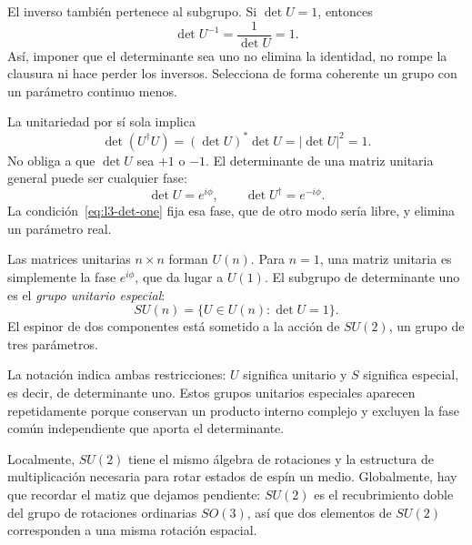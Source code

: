 El inverso también pertenece al subgrupo. Si \(\det U=1\), entonces
\begin{equation}
\det U^{-1}=\frac{1}{\det U}=1.
\end{equation}
Así, imponer que el determinante sea uno no elimina la identidad, no rompe la clausura ni hace perder los inversos. Selecciona de forma coherente un grupo con un parámetro continuo menos.

La unitariedad por sí sola implica
\begin{equation}
\det(U^\dagger U)=
(\det U)^*\det U
=|\det U|^2=1.
\end{equation}
No obliga a que \(\det U\) sea \(+1\) o \(-1\). El determinante de una matriz unitaria general puede ser cualquier fase:
\begin{equation}
\det U=e^{i\phi},
\qquad
\det U^\dagger=e^{-i\phi}.
\end{equation}
La condición~\eqref{eq:l3-det-one} fija esa fase, que de otro modo sería libre, y elimina un parámetro real.

\begin{classroomqa}\end{classroomqa}

Las matrices unitarias \(n\times n\) forman \(U(n)\). Para \(n=1\), una matriz unitaria es simplemente la fase \(e^{i\phi}\), que da lugar a \(U(1)\). El subgrupo de determinante uno es el \emph{grupo unitario especial}:
\begin{equation}
SU(n)=\{U\in U(n):\det U=1\}.
\end{equation}
El espinor de dos componentes está sometido a la acción de \(SU(2)\), un grupo de tres parámetros.

La notación indica ambas restricciones: \(U\) significa unitario y \(S\) significa especial, es decir, de determinante uno. Estos grupos unitarios especiales aparecen repetidamente porque conservan un producto interno complejo y excluyen la fase común independiente que aporta el determinante.

Localmente, \(SU(2)\) tiene el mismo álgebra de rotaciones y la estructura de multiplicación necesaria para rotar estados de espín un medio. Globalmente, hay que recordar el matiz que dejamos pendiente: \(SU(2)\) es el recubrimiento doble del grupo de rotaciones ordinarias \(SO(3)\), así que dos elementos de \(SU(2)\) corresponden a una misma rotación espacial.

